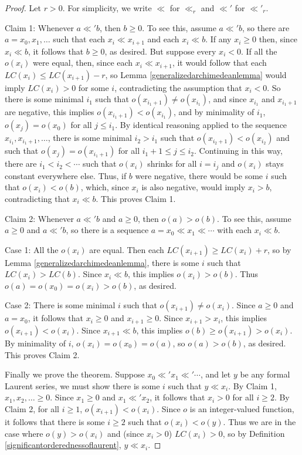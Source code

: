 \documentclass[twoside,11pt]{article}
\begin{document}
\begin{proof}
Let $r>0$. For simplicity, we write $\ll$ for $\ll_r$ and $\ll'$ for
$\ll'_r$.

Claim 1: Whenever $a\ll' b$, then $b\geq 0$.
To see this, assume $a\ll' b$, so there are $a=x_0,x_1,\ldots$ such that each
$x_i\ll x_{i+1}$ and each $x_i\ll b$.
If any $x_i\geq 0$ then, since $x_i\ll b$, it follows that $b\geq 0$, as desired.
But suppose every $x_i<0$.
If all the $o(x_i)$ were equal, then, since each
$x_i\ll x_{i+1}$, it would follow that each $LC(x_{i})\leq LC(x_{i+1})-r$, so Lemma
\ref{generalizedarchimedeanlemma} would imply $LC(x_i)>0$ for some $i$, contradicting
the assumption that $x_i<0$. So there is some minimal $i_1$ such
that $o(x_{i_1+1})\not=o(x_{i_1})$,
and since $x_{i_1}$ and $x_{i_1+1}$ are negative, this implies
$o(x_{i_1+1})<o(x_{i_1})$, and by minimality of $i_1$, $o(x_j)=o(x_0)$ for all
$j\leq i_1$.
By identical reasoning applied to the sequence $x_{i_1},x_{i_1+1},\ldots$,
there is some minimal $i_2>i_1$ such that $o(x_{i_2+1})<o(x_{i_2})$
and such that $o(x_j)=o(x_{i_1+1})$ for all $i_1+1\leq j\leq i_2$.
Continuing in this way, there are $i_1<i_2<\cdots$ such that $o(x_i)$ shrinks
for all $i=i_j$ and $o(x_i)$ stays constant everywhere else. Thus, if $b$ were negative,
there would be some $i$ such that $o(x_i)<o(b)$, which, since $x_i$ is also negative,
would imply $x_i>b$, contradicting that $x_i\ll b$. This proves Claim 1.

Claim 2: Whenever $a\ll' b$ and $a\geq 0$, then $o(a)>o(b)$.
To see this, assume $a\geq 0$ and $a\ll' b$, so there is a sequence
$a=x_0\ll x_1\ll\cdots$ with each $x_i\ll b$.

Case 1: All the $o(x_i)$ are equal. Then each $LC(x_{i+1})\geq LC(x_i)+r$, so by Lemma
\ref{generalizedarchimedeanlemma}, there is some $i$ such that $LC(x_i)>LC(b)$.
Since $x_i\ll b$, this implies $o(x_i)>o(b)$. Thus $o(a)=o(x_0)=o(x_i)>o(b)$, as desired.

Case 2: There is some minimal $i$ such that $o(x_{i+1})\not=o(x_{i})$.
Since $a\geq 0$ and $a=x_0$, it follows that $x_i\geq 0$ and $x_{i+1}\geq 0$. Since
$x_{i+1}>x_{i}$, this implies $o(x_{i+1})<o(x_{i})$.
Since $x_{i+1}\ll b$, this implies $o(b)\geq o(x_{i+1})>o(x_i)$.
By minimality of $i$, $o(x_i)=o(x_0)=o(a)$, so $o(a)>o(b)$, as desired. This proves Claim 2.

Finally we prove the theorem. Suppose $x_0\ll' x_1\ll' \cdots$, and let
$y$ be any formal Laurent series, we must show there is some $i$ such that
$y\ll x_i$. By Claim 1, $x_1,x_2,\ldots\geq 0$.
Since $x_1\geq 0$ and $x_1\ll' x_2$, it follows that $x_i>0$ for all $i\geq 2$.
By Claim 2, for all $i\geq 1$, $o(x_{i+1})<o(x_i)$.
Since $o$ is an integer-valued function, it follows that there is some $i\geq 2$
such that $o(x_i)<o(y)$.
Thus we are in the case where $o(y)>o(x_i)$ and (since $x_i> 0$) $LC(x_i)>0$,
so by Definition \ref{significantorderednessoflaurent}, $y\ll x_i$.
\end{proof}
\end{document}
